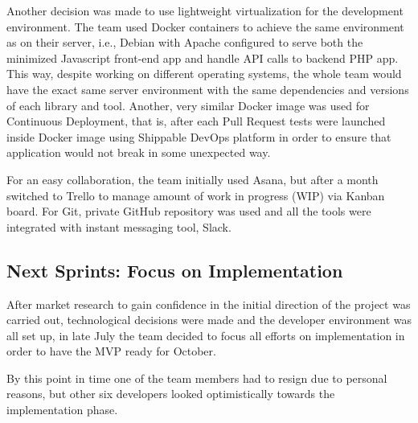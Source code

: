 \documentclass{article}
\begin{document}
Another decision was made to use lightweight virtualization for the development environment. The team used Docker containers to achieve the same environment as on their server, i.e., Debian with Apache configured to serve both the minimized Javascript front-end app and handle API calls to backend PHP app. This way, despite working on different operating systems, the whole team would have the exact same server environment with the same dependencies and versions of each library and tool. Another, very similar Docker image was used for Continuous Deployment, that is, after each Pull Request tests were launched inside Docker image using Shippable DevOps platform in order to ensure that application would not break in some unexpected way.

For an easy collaboration, the team initially used Asana, but after a month switched to Trello to manage amount of work in progress (WIP) via Kanban board. For Git, private GitHub repository was used and all the tools were integrated with instant messaging tool, Slack.

\subsection{Next Sprints: Focus on Implementation}
After market research to gain confidence in the initial direction of the project was carried out, technological decisions were made and the developer environment was all set up, in late July the team decided to focus all efforts on implementation in order to have the MVP ready for October.

By this point in time one of the team members had to resign due to personal reasons, but other six developers looked optimistically towards the implementation phase.
\end{document}
